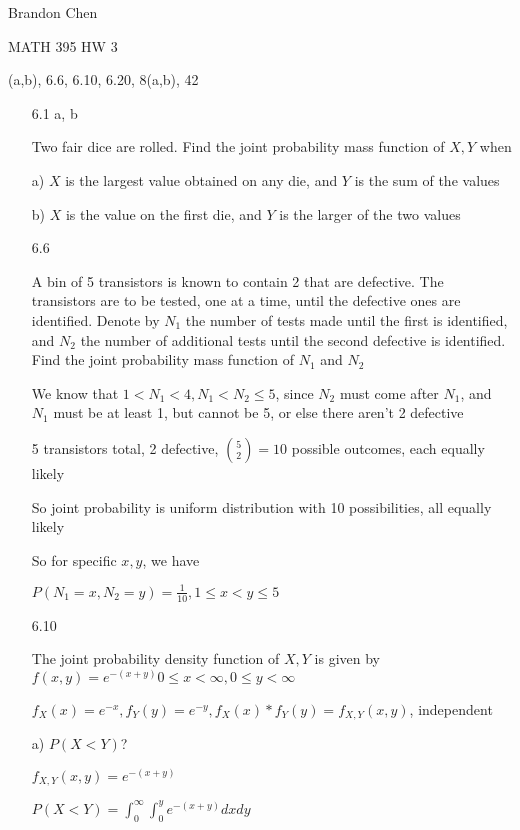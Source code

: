 \documentclass[11pt]{article}
\begin{document}
\noindent Brandon Chen

\noindent MATH 395 HW 3

(a,b), 6.6, 6.10, 6.20, 8(a,b), 42 


\begin{itemize}

\item[6.1 a, b]
	
	Two fair dice are rolled. Find the joint probability mass function of $X, Y$ when

		a) $X$ is the largest value obtained on any die, and $Y$ is the sum of the values

		b) $X$ is the value on the first die, and $Y$ is the larger of the two values





\newpage

\item[6.6]

	A bin of 5 transistors is known to contain 2 that are defective. The transistors are to be tested, one at a time, until the defective ones are identified. Denote by $N_1$ the number of tests made until the first is identified, and $N_2$ the number of additional tests until the second defective is identified. Find the joint probability mass function of $N_1$ and $N_2$

	We know that $1 < N_1 < 4, N_1 < N_2 \leq 5$, since $N_2$ must come after $N_1$, and $N_1$ must be at least 1, but cannot be 5, or else there aren't 2 defective

		5 transistors total, 2 defective, $\binom{5}{2} = 10$ possible outcomes, each equally likely

		So joint probability is uniform distribution with 10 possibilities, all equally likely

		So for specific $x, y$, we have

		$P(N_1 = x, N_2 = y) = \frac{1}{10}, 1 \leq x < y \leq 5$

\item[6.10]

	The joint probability density function of $X, Y$ is given by $f(x,y) = e^{-(x+y)} 0 \leq x < \infty, 0 \leq y < \infty$

		$f_X(x) = e^{-x}, f_Y(y) = e^{-y}, f_X(x) * f_Y(y) = f_{X,Y}(x,y)$, independent

	a) $P(X < Y)$?
	
		$f_{X,Y}(x,y) = e^{-(x+y)}$

		$P(X < Y) = \int_{0}^{\infty} \int_{0}^{y} e^{-(x+y)} dx dy$


\end{itemize}
\end{document}
